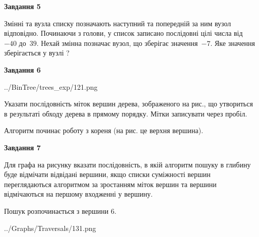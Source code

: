 \documentclass[12pt, ukrainian]{article}
\begin{document}
{\begin {large}
{\begin {center}\textbf{Завдання 5}\end {center}}\par
Змінні  та  вузла списку позначають наступний та попередній за ним вузол відповідно. Починаючи з голови, у список записано послідовні цілі числа від~$-40$ до~$39$. Нехай змінна  позначає вузол, що зберігає значення~$-7$.
Яке значення зберігається у вузлі  ?\par
\newpage

{\begin {center}\textbf{Завдання 6}\end {center}}\par

\begin{center}
	{../BinTree/trees_exp/121.png}
\end{center}
Указати послідовність міток вершин дерева, зображеного на рис., що утвориться в результаті обходу дерева в прямому порядку. Мітки записувати через пробіл.\par Алгоритм починає роботу з кореня (на рис. це верхня вершина).\par
\newpage

{\begin {center}\textbf{Завдання 7}\end {center}}\par
Для графа на рисунку вказати послідовність, в якій алгоритм пошуку в глибину буде відмічати відвідані вершини, якщо списки суміжності вершин переглядаються алгоритмом за зростанням міток вершин та вершини відмічаються на першому вход\-женні у вершину.\par
Пошук розпочинається з вершини 6.\par

\begin{center}
	{../Graphs/Traversals/131.png}
\end{center}\par
\newpage


\end{large}}
\end{document}
